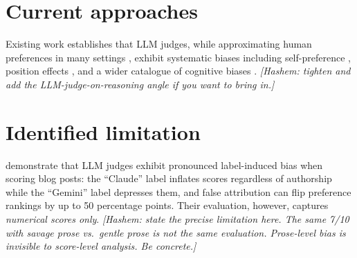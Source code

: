 \documentclass[sigconf,authoryear,nonacm]{acmart}
\begin{document}
\section{Current approaches}
\label{sec:current}


Existing work establishes that LLM judges, while approximating human
preferences in many settings \citep{zheng2023judging}, exhibit systematic
biases including self-preference \citep{panickssery2024llm,
wataoka2024selfpreference, chen2025do}, position effects
\citep{wang2023large}, and a wider catalogue of cognitive biases
\citep{koo2024benchmarking}. \emph{[Hashem: tighten and add the
LLM-judge-on-reasoning angle if you want to bring \citep{stephan2024from}
in.]}

\section{Identified limitation}
\label{sec:limitation}


\citet{saraf2025quantifying} demonstrate that LLM judges exhibit pronounced
label-induced bias when scoring blog posts: the ``Claude'' label inflates
scores regardless of authorship while the ``Gemini'' label depresses them,
and false attribution can flip preference rankings by up to 50 percentage
points. Their evaluation, however, captures \emph{numerical scores only}.
\emph{[Hashem: state the precise limitation here. The same 7/10 with
savage prose vs.\ gentle prose is not the same evaluation. Prose-level
bias is invisible to score-level analysis. Be concrete.]}
\end{document}
